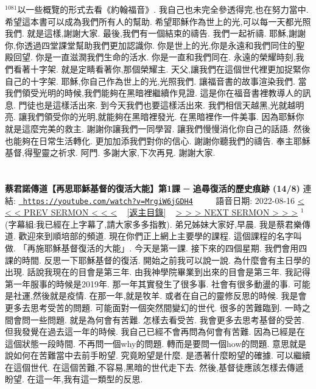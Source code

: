 \documentclass{book}
\begin{document}
$^{1081}$以一些概覽的形式去看《約翰福音》.
我自己也未完全參透得完,也在努力當中.
希望這本書可以成為我們所有人的幫助.
希望耶穌作為世上的光,可以每一天都光照我們.
就是這樣,謝謝大家.
最後,我們有一個結束的禱告.
我們一起祈禱.
耶穌,謝謝你,你透過四堂課堂幫助我們更加認識你.
你是世上的光,你是永遠和我們同住的聖殿回望.
你是一直滋潤我們生命的活水.
你是一直和我們同在.
永遠的榮耀時刻,我們看著十字架.
就是定睛看著你,那個榮耀主.
天父,讓我們在這個世代裡更加捉緊你自己的十字架.
耶穌,你自己作為世上的光,光照我們.
讓福音書的故事渲染我們.
當我們領受光明的時候,我們能夠在黑暗裡繼續作見證.
這是你在福音書裡教導人的訊息.
門徒也是這樣活出來.
到今天我們也要這樣活出來.
我們相信天越黑,光就越明亮.
讓我們領受你的光明,就能夠在黑暗裡發光.
在黑暗裡作一件美事.
因為耶穌你就是這麼完美的救主.
謝謝你讓我們一同學習.
讓我們慢慢消化你自己的話語.
然後也能夠在日常生活轉化.
更加加添我們對你的信心.
謝謝你聽我們的禱告.
奉主耶穌基督,得聖靈之祈求.
阿門.
多謝大家,下次再見.
謝謝大家.
\newpage



\section{}
\label{sec:MrgiW6jGDH4}
\textbf{蔡君諾傳道【再思耶穌基督的復活大能】第1課 ─ 追尋復活的歷史痕跡 (14/8)}
\newline
\newline
連結: \href{https://youtube.com/watch?v=MrgiW6jGDH4}{\texttt{ https://youtube.com/watch?v=MrgiW6jGDH4}} ~~~~ 語音日期: 2022-08-16 
\newline
\newline
\hyperref[sec:k_cCh3J_U2w]{\small{< < < PREV SERMON < < <}}
~
\hyperref[sec:index]{\small{[返主目錄]}}
~
\hyperref[sec:VcMUdsC37SI]{\small{> > > NEXT SERMON > > >}}
\newline
\newline
$^{1}$(字幕組:我已經在上字幕了,請大家多多指教).
弟兄姊妹大家好,早晨.
我是蔡君樂傳道.
歡迎來到順培部的頻道.
現在你們正上網上主要學的課程.
這個課程的名字叫做.
「再施耶穌基督復活的大能」.
今天是第一課.
接下來的四個星期.
我們會用四課的時間.
反思一下耶穌基督的復活.
開始之前我可以說一說.
為什麼會有主日學的出現.
話說我現在的目會是第三年.
由我神學院畢業到出來的目會是第三年.
我記得第一年服事的時候是2019年.
那一年其實發生了很多事.
社會有很多動盪的事.
可能是社運,然後就是疫情.
在那一年,就是牧羊.
或者在自己的靈修反思的時候.
我是會更多去思考受苦的問題.
可能面對一個突然間變幻的世代.
很多的苦難臨到.
一時之間會問一些問題.
就是為何會有苦難.
怎樣去看受苦.
我會更多去思考基督的受苦.
但我發覺在過去這一年的時候.
我自己已經不會再問為何會有苦難.
因為已經是在這個狀態一段時間.
不再問一個why的問題.
轉而是要問一個how的問題.
意思就是說如何在苦難當中去前手盼望.
究竟盼望是什麼.
是憑著什麼盼望的確據.
可以繼續在這個世代.
在這個苦難,不容易,黑暗的世代走下去.
然後,基督徒應該怎樣去傳遞盼望.
在這一年,我有這一類型的反思.
\end{document}
